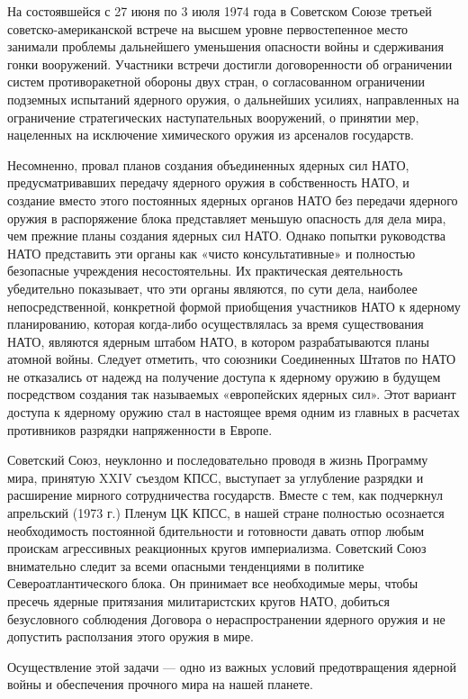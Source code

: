 \documentclass[12pt, a4paper, openany]{book}
\begin{document}
На состоявшейся с 27 июня по 3 июля 1974 года в Советском Союзе третьей советско-американской встрече на высшем уровне первостепенное место занимали проблемы дальнейшего уменьшения опасности войны и сдерживания гонки вооружений. Участники встречи достигли договоренности об ограничении систем противоракетной обороны двух стран, о согласованном ограничении подземных испытаний ядерного оружия, о дальнейших усилиях, направленных на ограничение стратегических наступательных вооружений, о принятии мер, нацеленных на исключение химического оружия из арсеналов государств.

Несомненно, провал планов создания объединенных ядерных сил НАТО, предусматривавших передачу ядерного оружия в собственность НАТО, и создание вместо этого постоянных ядерных органов НАТО без передачи ядерного оружия в распоряжение блока представляет меньшую опасность для дела мира, чем прежние планы создания ядерных сил НАТО. Однако попытки руководства НАТО представить эти органы как «чисто консультативные» и полностью безопасные учреждения несостоятельны. Их практическая деятельность убедительно показывает, что эти органы являются, по сути дела, наиболее непосредственной, конкретной формой приобщения участников НАТО к ядерному планированию, которая когда-либо осуществлялась за время существования НАТО, являются ядерным штабом НАТО, в котором разрабатываются планы атомной войны. Следует отметить, что союзники Соединенных Штатов по НАТО не отказались от надежд на получение доступа к ядерному оружию в будущем посредством создания так называемых «европейских ядерных сил». Этот вариант доступа к ядерному оружию стал в настоящее время одним из главных в расчетах противников разрядки напряженности в Европе.

Советский Союз, неуклонно и последовательно проводя в жизнь Программу мира, принятую XXIV съездом КПСС, выступает за углубление разрядки и расширение мирного сотрудничества государств. Вместе с тем, как подчеркнул апрельский (1973 г.) Пленум ЦК КПСС, в нашей стране полностью осознается необходимость постоянной бдительности и готовности давать отпор любым проискам агрессивных реакционных кругов империализма. Советский Союз внимательно следит за всеми опасными тенденциями в политике Североатлантического блока. Он принимает все необходимые меры, чтобы пресечь ядерные притязания милитаристских кругов НАТО, добиться безусловного соблюдения Договора о нераспространении ядерного оружия и не допустить расползания этого оружия в мире.

Осуществление этой задачи — одно из важных условий предотвращения ядерной войны и обеспечения прочного мира на нашей планете.
\end{document}
